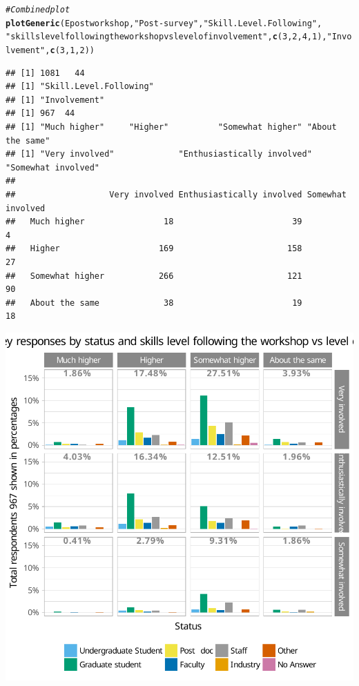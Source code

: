 \documentclass{article}\usepackage[]{graphicx}\usepackage[]{color}
\makeatletter
\newcommand{\hlnum}[1]{\textcolor[rgb]{0.686,0.059,0.569}{#1}}%
\newcommand{\hlstr}[1]{\textcolor[rgb]{0.192,0.494,0.8}{#1}}%
\newcommand{\hlcom}[1]{\textcolor[rgb]{0.678,0.584,0.686}{\textit{#1}}}%
\newcommand{\hlstd}[1]{\textcolor[rgb]{0.345,0.345,0.345}{#1}}%
\newcommand{\hlkwd}[1]{\textcolor[rgb]{0.737,0.353,0.396}{\textbf{#1}}}%
\newenvironment{kframe}{%
 \def\at@end@of@kframe{}%
 \ifinner\ifhmode%
  \def\at@end@of@kframe{\end{minipage}}%
  \begin{minipage}{\columnwidth}%
 \fi\fi%
 \def\FrameCommand##1{\hskip\@totalleftmargin \hskip-\fboxsep
 \colorbox{shadecolor}{##1}\hskip-\fboxsep
     \hskip-\linewidth \hskip-\@totalleftmargin \hskip\columnwidth}%
 \MakeFramed {\advance\hsize-\width
   \@totalleftmargin\z@ \linewidth\hsize
   \@setminipage}}%
 {\par\unskip\endMakeFramed%
 \at@end@of@kframe}
\newenvironment{knitrout}{}{} %
\makeatother
\begin{document}
\begin{knitrout}
\begin{kframe}\begin{alltt}
\hlcom{# Combined plot}
\hlkwd{plotGeneric}\hlstd{(Epostworkshop,} \hlstr{"Post-survey"}\hlstd{,} \hlstr{"Skill.Level.Following"} \hlstd{,}
            \hlstr{"skills level following the workshop vs level of involvement"}\hlstd{,}  \hlkwd{c}\hlstd{(}\hlnum{3}\hlstd{,}\hlnum{2}\hlstd{,}\hlnum{4}\hlstd{,}\hlnum{1}\hlstd{),}\hlstr{"Involvement"}\hlstd{,} \hlkwd{c}\hlstd{(}\hlnum{3}\hlstd{,}\hlnum{1}\hlstd{,}\hlnum{2}\hlstd{))}
\end{alltt}
\begin{verbatim}
## [1] 1081   44
## [1] "Skill.Level.Following"
## [1] "Involvement"
## [1] 967  44
## [1] "Much higher"     "Higher"          "Somewhat higher" "About the same" 
## [1] "Very involved"             "Enthusiastically involved" "Somewhat involved"        
##                  
##                   Very involved Enthusiastically involved Somewhat involved
##   Much higher                18                        39                 4
##   Higher                    169                       158                27
##   Somewhat higher           266                       121                90
##   About the same             38                        19                18
\end{verbatim}
\end{kframe}

{\centering \includegraphics[width=.6\linewidth]{figure/calls-Rnwplotting-postsurvey-data-16} 

}



\end{knitrout}
\end{document}
